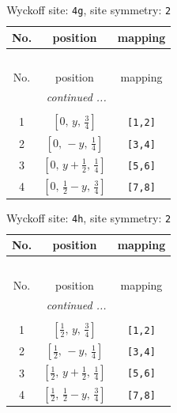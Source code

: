 \documentclass[fleqn,8pt]{jsarticle}
\begin{document}
\renewcommand{\arraystretch}{1.2}
\begin{longtable}{ccc}
\caption{Wyckoff site: {\tt 4g}, site symmetry: {\tt 2}}
 \\
 \hline \hline
No. & position & mapping \\ \hline \endfirsthead

\multicolumn{2}{l}{\tablename\ \thetable{}} \\
 \hline \hline
No. & position & mapping \\ \hline \endhead

 \hline \hline
\multicolumn{2}{r}{\footnotesize\it continued ...} \\ \endfoot

 \hline \hline
\multicolumn{2}{r}{} \\ \endlastfoot

1 & $\left[ 0,\, y,\, \frac{3}{4} \right]$ & {\tt [1,2]} \\ \hline
2 & $\left[ 0,\, - y,\, \frac{1}{4} \right]$ & {\tt [3,4]} \\ \hline
3 & $\left[ 0,\, y + \frac{1}{2},\, \frac{1}{4} \right]$ & {\tt [5,6]} \\ \hline
4 & $\left[ 0,\, \frac{1}{2} - y,\, \frac{3}{4} \right]$ & {\tt [7,8]} \\
\end{longtable}
\renewcommand{\arraystretch}{1.2}
\begin{longtable}{ccc}
\caption{Wyckoff site: {\tt 4h}, site symmetry: {\tt 2}}
 \\
 \hline \hline
No. & position & mapping \\ \hline \endfirsthead

\multicolumn{2}{l}{\tablename\ \thetable{}} \\
 \hline \hline
No. & position & mapping \\ \hline \endhead

 \hline \hline
\multicolumn{2}{r}{\footnotesize\it continued ...} \\ \endfoot

 \hline \hline
\multicolumn{2}{r}{} \\ \endlastfoot

1 & $\left[ \frac{1}{2},\, y,\, \frac{3}{4} \right]$ & {\tt [1,2]} \\ \hline
2 & $\left[ \frac{1}{2},\, - y,\, \frac{1}{4} \right]$ & {\tt [3,4]} \\ \hline
3 & $\left[ \frac{1}{2},\, y + \frac{1}{2},\, \frac{1}{4} \right]$ & {\tt [5,6]} \\ \hline
4 & $\left[ \frac{1}{2},\, \frac{1}{2} - y,\, \frac{3}{4} \right]$ & {\tt [7,8]} \\
\end{longtable}
\end{document}
